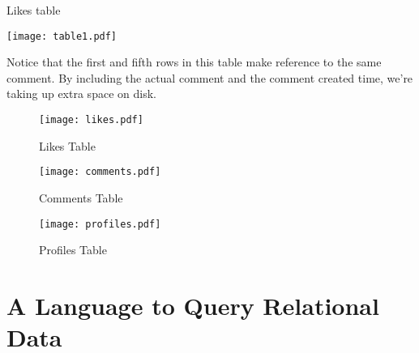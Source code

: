 \documentclass[mathserif, xcolor=table, pdfpages, default, graphics, listings]{beamer}
\begin{document}
        \begin{frame}
        {Likes table}
        \centerline{
        \texttt{[image: table1.pdf]}
        }
	\pause Notice that the first and fifth rows in this table make reference to the same comment. By including the actual comment and the comment created time, we're taking up extra space on disk.
        \end{frame}     



        \begin{frame}
            \begin{figure}[h!]
                \centering
                \caption{\tiny Likes Table}
                \vspace{-0.1in}
                \texttt{[image: likes.pdf]}
            \end{figure}
                \vspace{-0.2in}
            \begin{figure}[h!]
                \caption{\tiny Comments Table}
                \vspace{-0.1in}
                \texttt{[image: comments.pdf]}
            \end{figure}
                \vspace{-0.2in}
            \begin{figure}[h!]
                \caption{\tiny Profiles Table}
                \vspace{-0.1in}
                \texttt{[image: profiles.pdf]}
            \end{figure}
        \end{frame}        
        


    \section{A Language to Query Relational Data}

\end{document}
